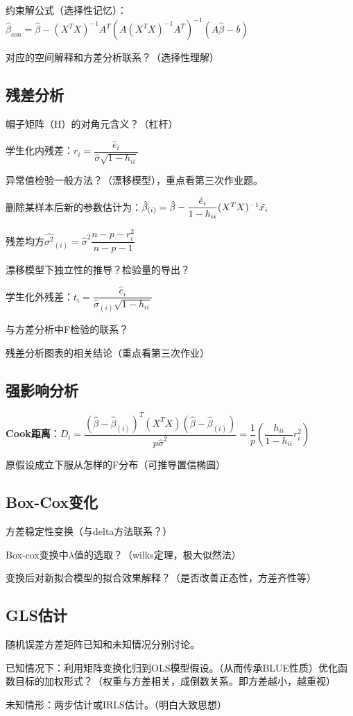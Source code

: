 \documentclass[cn,hazy,green,12pt,normal]{elegantnote}
\numberwithin{equation}{section}
\numberwithin{subsection}{section}
\begin{document}
约束解公式（选择性记忆）：$\hat{\beta}_{con} = \hat{\beta}-(X^TX)^{-1}A^T(A(X^TX)^{-1}A^T)^{-1}(A\hat{\beta}-b)$

对应的空间解释和方差分析联系？（选择性理解）

\subsection{残差分析}
帽子矩阵（H）的对角元含义？（杠杆）

学生化内残差：$r_i = \dfrac{\hat{e}_i}{\hat{\sigma}\sqrt{1-h_{ii}}}$

异常值检验一般方法？（漂移模型），重点看第三次作业题。

删除某样本后新的参数估计为：$\hat{\beta}_{(i)} = \hat{\beta}-\dfrac{\hat{e}_i}{1-h_{ii}}(X^TX)^{-1}\Tilde{x_i}$

残差均方$\hat{\sigma^2}_{(i)}=\hat{\sigma}^2\dfrac{n-p-r_i^2}{n-p-1}$

漂移模型下独立性的推导？检验量的导出？

学生化外残差：$t_i = \dfrac{\hat{e}_i}{\hat{\sigma}_{(i)}\sqrt{1-h_{ii}}}$

与方差分析中F检验的联系？

残差分析图表的相关结论（重点看第三次作业）

\subsection{强影响分析}
\textbf{Cook距离}：$D_i = \dfrac{(\hat{\beta}-\hat{\beta}_{(i)})^T(X^TX)(\hat{\beta}-\hat{\beta}_{(i)})}{p\hat{\sigma}^2}=\dfrac{1}{p}(\dfrac{h_{ii}}{1-h_{ii}}r_i^2)$

原假设成立下服从怎样的F分布（可推导置信椭圆）

\subsection{Box-Cox变化}
方差稳定性变换（与delta方法联系？）

Box-cox变换中$\lambda$值的选取？（wilks定理，极大似然法）

变换后对新拟合模型的拟合效果解释？（是否改善正态性，方差齐性等）

\subsection{GLS估计}
随机误差方差矩阵已知和未知情况分别讨论。

已知情况下：利用矩阵变换化归到OLS模型假设。（从而传承BLUE性质）优化函数目标的加权形式？（权重与方差相关，成倒数关系。即方差越小，越重视）

未知情形：两步估计或IRLS估计。（明白大致思想）
\end{document}
